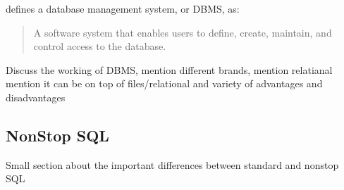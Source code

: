 \cite{dbhist1} defines a database management system, or DBMS, as:
\begin{quote}
	A software system that enables users to define, create, maintain, and control
	access to the database.
\end{quote}

Discuss the working of DBMS, mention different brands, mention relatianal mention it can be on top of files/relational and variety of advantages and disadvantages


\subsection{NonStop SQL}

Small section about the important differences between standard and nonstop SQL

